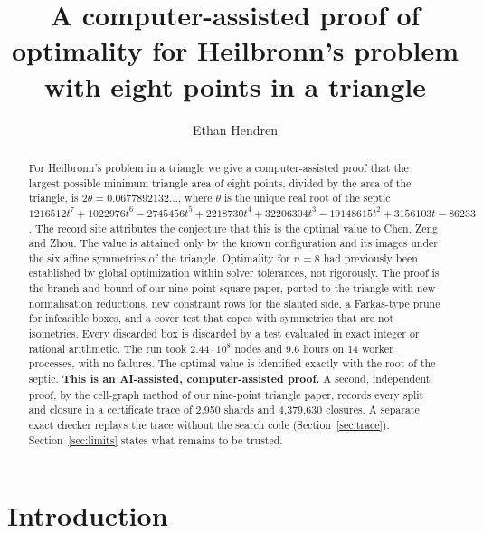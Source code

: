 \documentclass[11pt]{amsart}
\theoremstyle{definition}
\begin{document}
\title[Heilbronn's problem for eight points in a triangle]{A computer-assisted proof of optimality for Heilbronn's problem with eight points in a triangle}

\author{Ethan Hendren}

\begin{abstract}
For Heilbronn's problem in a triangle we give a computer-assisted proof that the largest possible minimum triangle area of eight points, divided by the area of the triangle, is $2\theta = 0.0677892132\ldots$, where $\theta$ is the unique real root of the septic $1216512 t^7 + 1022976 t^6 - 2745456 t^5 + 2218730 t^4 + 32206304 t^3 - 19148615 t^2 + 3156103 t - 86233$. The record site attributes the conjecture that this is the optimal value to Chen, Zeng and Zhou. The value is attained only by the known configuration and its images under the six affine symmetries of the triangle.
Optimality for $n = 8$ had previously been established by global optimization within solver tolerances, not rigorously.
The proof is the branch and bound of our nine-point square paper, ported to the triangle with new normalisation reductions, new constraint rows for the slanted side, a Farkas-type prune for infeasible boxes, and a cover test that copes with symmetries that are not isometries. Every discarded box is discarded by a test evaluated in exact integer or rational arithmetic. The run took $2.44\cdot10^{8}$ nodes and $9.6$ hours on 14 worker processes, with no failures. The optimal value is identified exactly with the root of the septic.
\textbf{This is an AI-assisted, computer-assisted proof.} A second, independent proof, by the cell-graph method of our nine-point triangle paper, records every split and closure in a certificate trace of 2{,}950 shards and 4{,}379{,}630 closures. A separate exact checker replays the trace without the search code (Section~\ref{sec:trace}). Section~\ref{sec:limits} states what remains to be trusted.
\end{abstract}

\maketitle

\section{Introduction}\label{sec:intro}
\end{document}
